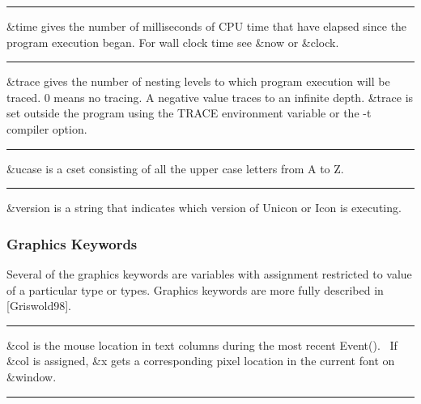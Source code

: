 \bigskip\hrule\vspace{0.1cm}

\noindent
{}\textsf{\&}\textsf{time}
gives the number of milliseconds of CPU time that have elapsed since
the program execution began. For wall clock time see \textsf{\&now} or
\textsf{\&clock}.

\bigskip\hrule\vspace{0.1cm}

\noindent
\textsf{\&trace} gives the number of nesting levels to which
program execution will be traced. 0 means no tracing.
A negative value traces to an infinite depth.
\textsf{\&trace} is set outside the program using the \textsf{TRACE}
environment variable or the
\textsf{{}-t} compiler option.

\bigskip\hrule\vspace{0.1cm}

\noindent
{}\textsf{\&ucase} is a cset consisting of all the upper
case letters from A to Z.

\bigskip\hrule\vspace{0.1cm}

\noindent
{}\textsf{\&version} is a string that indicates which
version of Unicon or Icon is executing.

\subsubsection{Graphics Keywords}

Several of the graphics keywords are variables with assignment
restricted to value of a particular type or types. Graphics keywords
are more fully described in [Griswold98].

\bigskip\hrule\vspace{0.1cm}

\noindent
\textsf{\&col} is the mouse location in text columns during the most
recent \textsf{Event()}. \ If \textsf{\&col} is assigned, \textsf{\&x}
gets a corresponding pixel location in the current font on
\textsf{\&window}.

\bigskip\hrule\vspace{0.1cm}

